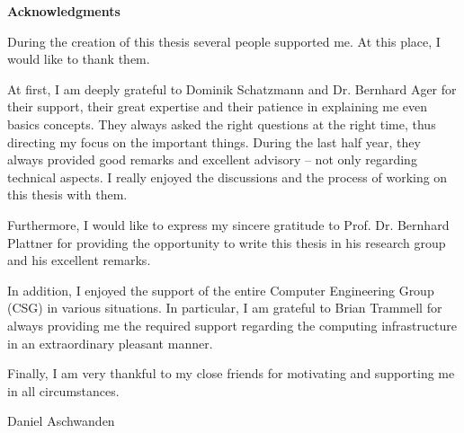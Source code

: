 

\clearpage 
\begin{center}
	\textbf{Acknowledgments} 
\end{center}

During the creation of this thesis several people supported me. At this place, I would like to thank them.

At first, I am deeply grateful to Dominik Schatzmann and Dr. Bernhard Ager for their support, their great expertise and their patience in explaining me even basics concepts. They always asked the right questions at the right time, thus directing my focus on the important things. During the last half year, they always provided good remarks and excellent advisory -- not only regarding technical aspects. I really enjoyed the discussions and the process of working on this thesis with them. 

Furthermore, I would like to express my sincere gratitude to Prof. Dr. Bernhard Plattner for providing the opportunity to write this thesis in his research group and his excellent remarks. 

In addition, I enjoyed the support of the entire Computer Engineering Group (CSG) in various situations. In particular, I am grateful to Brian Trammell for always providing me the required support regarding the computing infrastructure in an extraordinary pleasant manner. 

Finally, I am very thankful to my close friends for motivating and supporting me in all circumstances.

\vspace{1cm} Daniel Aschwanden 
\vfil

